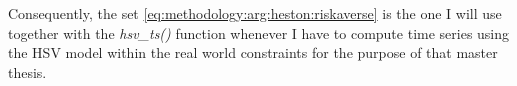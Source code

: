 \documentclass[12pt]{report}
\begin{document}
Consequently, the set \ref{eq:methodology:arg:heston:riskaverse} is the one I will use together with the \textit{hsv\_ts()} function whenever I have to compute time series using the HSV model within the real world constraints for the purpose of that master thesis.





























\end{document}
